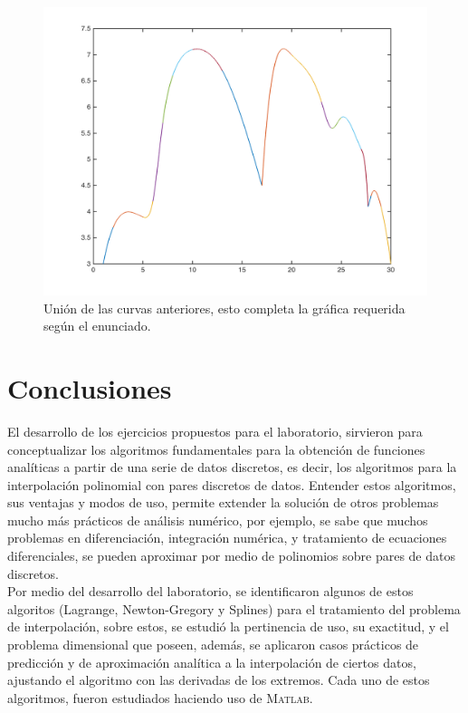 \documentclass[11pt, spanish]{article}
\begin{document}
\begin{figure}[!hbt]
\centering
	\includegraphics[scale=0.6]{data/img/beastcurve}
	\caption{Unión de las curvas anteriores, esto completa la gráfica requerida según el enunciado.}
\end{figure}


\section{Conclusiones}

El desarrollo de los ejercicios propuestos para el laboratorio, sirvieron para conceptualizar los algoritmos fundamentales para la obtención de funciones analíticas a partir de una serie de datos discretos, es decir, los algoritmos para la interpolación polinomial con pares discretos de datos.  Entender estos algoritmos, sus ventajas y modos de uso, permite extender la solución de otros problemas mucho más prácticos de análisis numérico, por ejemplo, se sabe que muchos problemas en diferenciación, integración numérica, y tratamiento de ecuaciones diferenciales, se pueden aproximar por medio de polinomios sobre pares de datos discretos.\\

Por medio del desarrollo del laboratorio, se identificaron algunos de estos algoritos (Lagrange, Newton-Gregory y Splines) para el tratamiento del problema de interpolación, sobre estos, se estudió la pertinencia de uso, su exactitud, y el problema dimensional que poseen, además, se aplicaron casos prácticos de predicción y de aproximación analítica a la interpolación de ciertos datos, ajustando el algoritmo con las derivadas de los extremos. Cada uno de estos algoritmos, fueron estudiados haciendo uso de \textsc{Matlab}.
\end{document}
